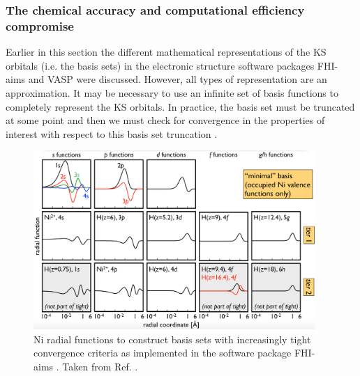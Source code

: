 \documentclass[11pt, twoside]{report}
\begin{document}
\subsubsection{The chemical accuracy and computational efficiency compromise}\label{chem_acc_vs_eff}
Earlier in this section the different mathematical representations of the KS orbitals (i.e. the basis sets) in the electronic structure software packages FHI-aims and VASP were discussed. However, all types of representation are an approximation. It may be necessary to use an infinite set of basis functions to completely represent the KS orbitals. In practice, the basis set must be truncated at some point and then we must check for convergence in the properties of interest with respect to this basis set truncation \cite{Prasad_ch6}. 

\begin{figure}[h!]
  \centering
    \includegraphics[width=0.95\textwidth]{figures/FHI-aims_tiers.png}
    \caption[Ni radial functions to construct basis sets with increasingly tight convergence criteria as implemented in the software package FHI-aims.]{Ni radial functions to construct basis sets with increasingly tight convergence criteria as implemented in the software package FHI-aims \cite{FHI-aims}. Taken from Ref. .}
  \label{FHI-aims_tiers}
\end{figure}
\end{document}
